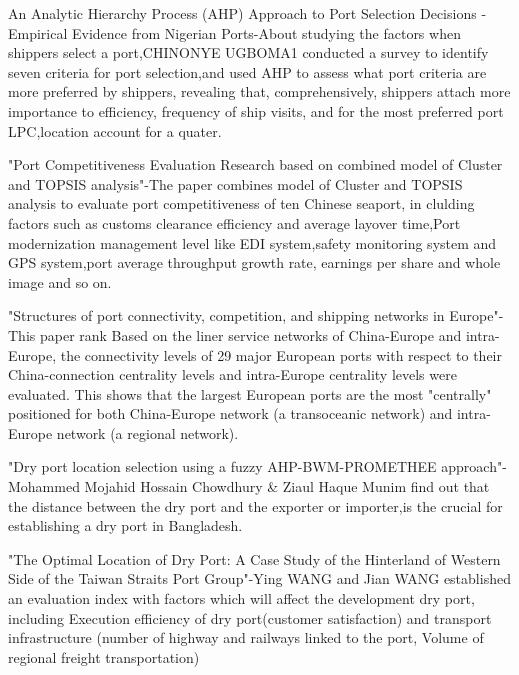 \documentclass[preprint]{elsarticle}
\begin{document}
An Analytic Hierarchy Process (AHP) Approach to Port Selection Decisions - Empirical Evidence from Nigerian Ports-About studying the factors when shippers select a port,CHINONYE UGBOMA1 conducted a survey to identify seven criteria for port selection,and used AHP to assess what port criteria are more preferred by shippers, revealing that, comprehensively, shippers attach more importance to efficiency, frequency of ship visits, and for the most preferred port LPC,location account for a quater.

"Port Competitiveness Evaluation Research based on combined model of Cluster and TOPSIS analysis"-The paper combines model of Cluster and TOPSIS analysis to evaluate port competitiveness of ten Chinese seaport, in clulding factors such as customs clearance efficiency and average layover time,Port modernization  management level like EDI system,safety monitoring system and GPS system,port average throughput growth rate, earnings per share and whole image and so on.

% 
"Structures of port connectivity, competition, and shipping networks in Europe"-This paper rank Based on the liner service networks of China-Europe and intra-Europe, the connectivity levels of 29 major European ports with respect to their China-connection centrality levels and intra-Europe centrality levels were evaluated. This shows that the largest European ports are the most "centrally" positioned for both China-Europe network (a transoceanic network) and intra-Europe network (a regional network).

"Dry port location selection using a fuzzy AHP-BWM-PROMETHEE approach"-Mohammed Mojahid Hossain Chowdhury \& Ziaul Haque Munim find out that the distance between the dry port and the exporter or importer,is the crucial for establishing a dry port in Bangladesh.

"The Optimal Location of Dry Port: A Case Study of the Hinterland of Western Side of the Taiwan Straits Port Group"-Ying WANG and Jian WANG established an evaluation index with factors which will affect the development dry port, including Execution efficiency of dry port(customer satisfaction) and transport infrastructure (number of highway and railways linked to the port, Volume of regional freight transportation)
% 
% 
% 
% 
% 
% 
% 
% 
% 
% 
% 
% 
\end{document}
